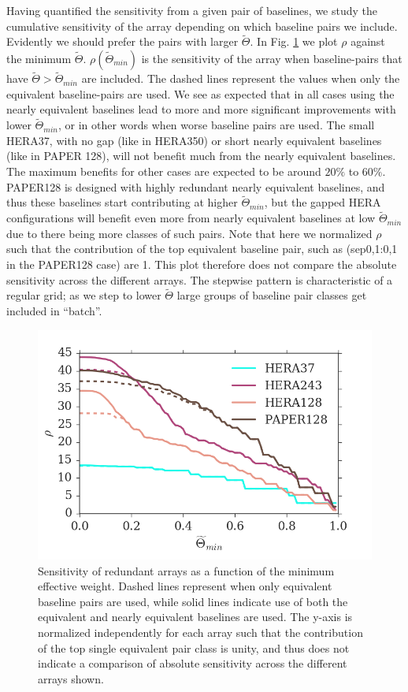 \documentclass[twocolumn,apj,numberedappendix]{emulateapj}
\renewcommand\[{\begin{equation}}
\renewcommand\]{\end{equation}}
\begin{document}
Having quantified the sensitivity from a given pair of baselines, we study the cumulative sensitivity of the array depending on which baseline pairs we include. Evidently we should prefer the pairs with larger $\widetilde{\Theta}$. In Fig. \ref{fig:osens} we plot $\rho$ against the minimum $\widetilde{\Theta}$. $\rho(\widetilde{\Theta}_{min})$ is the sensitivity of the array when baseline-pairs that have $\widetilde{\Theta}>\widetilde{\Theta}_{min}$ are included. The dashed lines represent the values when only the equivalent baseline-pairs are used.  We see as expected that in all cases using the nearly equivalent baselines lead to more and more significant improvements with lower $\widetilde{\Theta}_{min}$, or in other words when worse baseline pairs are used. The small HERA37, with no gap (like in HERA350) or short nearly equivalent baselines (like in PAPER 128), will not benefit much from the nearly equivalent baselines. The maximum benefits for other cases are expected to be around $20\%$ to $60\%$. PAPER128 is designed with highly redundant nearly equivalent baselines, and thus  these baselines start contributing at higher $\widetilde{\Theta}_{min}$, but the gapped HERA configurations will benefit even more from nearly equivalent baselines at low $\widetilde{\Theta}_{min}$ due to there being more classes of such pairs. Note that here we normalized $\rho$ such that the contribution of the top equivalent baseline pair, such as (sep0,1:0,1 in the PAPER128 case) are 1. This plot therefore does not compare the absolute sensitivity across the different arrays. The stepwise pattern is characteristic of a regular grid; as we step to lower $\widetilde{\Theta}$ large groups of baseline pair classes get included in ``batch''. 
\begin{figure}[H]
\includegraphics[width=\linewidth]{osens}
\caption{Sensitivity of redundant arrays as a function of the minimum effective weight. Dashed lines represent when only equivalent baseline pairs are used, while solid lines indicate use of both the equivalent and nearly equivalent baselines are used. The y-axis is normalized independently for each array such that the contribution of the top single equivalent pair class is unity, and thus does not indicate a comparison of absolute sensitivity across the different arrays shown.  }
\label{fig:osens}
\end{figure}
\end{document}
